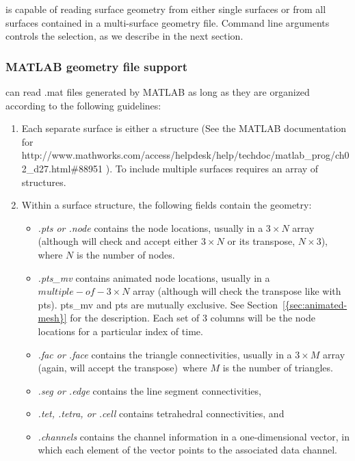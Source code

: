 \map{} is capable of reading surface geometry from either single surfaces
or from all surfaces contained in a multi-surface geometry file. 
Command line arguments controls the selection, as we describe in the next
section.

\subsubsection{MATLAB geometry file support}
\label{sec:matlabgeom}

\map{} can read .mat files generated by MATLAB as long as they are
organized according to the following guidelines:
\begin{enumerate}
  \item Each separate surface is either a structure (See 
    the MATLAB documentation for 
    {http://www.mathworks.com/access/helpdesk/help/techdoc/matlab\_prog/ch02\_d27.html\#88951}
     ).  To include multiple surfaces requires an array of
    structures.
  \item Within a surface structure, the following fields contain the
    geometry:
    \begin{itemize}
      \item \emph{.pts or .node} contains the node locations, usually in a
        $3 \times N$ array (although \map{} will check and accept either $3
        \times N$ or its transpose, $N \times 3$), where $N$ is the number
        of nodes.
      \item \emph{.pts_mv} contains animated node locations, usually in a
        $multiple-of-3 \times N$ array (although \map{} will check the transpose like with pts). 
	pts_mv and pts are mutually exclusive.  See Section~\ref{{sec:animated-mesh}} for the description.
	Each set of 3 columns will be the node locations for a particular index of time.
      \item \emph{.fac or .face} contains the triangle connectivities,
        usually in a $3 \times M$ array (again, \map{} will accept the
        transpose)\, where $M$ is the number of triangles.
      \item \emph{.seg or .edge} contains the line segment connectivities,
      \item \emph{.tet, .tetra, or .cell} contains tetrahedral
        connectivities, and
      \item \emph{.channels} contains the channel information in a
        one-dimensional vector, in which each element of the vector points
        to the associated data channel.
    \end{itemize}
\end{enumerate}

